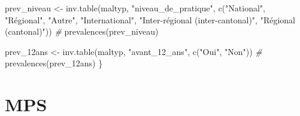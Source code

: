 \documentclass[
]{article}
\newenvironment{Shaded}{\begin{snugshade}}{\end{snugshade}}
\newcommand{\CommentTok}[1]{\textcolor[rgb]{0.56,0.35,0.01}{\textit{#1}}}
\newcommand{\ControlFlowTok}[1]{\textcolor[rgb]{0.13,0.29,0.53}{\textbf{#1}}}
\newcommand{\DecValTok}[1]{\textcolor[rgb]{0.00,0.00,0.81}{#1}}
\newcommand{\FunctionTok}[1]{\textcolor[rgb]{0.00,0.00,0.00}{#1}}
\newcommand{\NormalTok}[1]{#1}
\newcommand{\OtherTok}[1]{\textcolor[rgb]{0.56,0.35,0.01}{#1}}
\newcommand{\SpecialCharTok}[1]{\textcolor[rgb]{0.00,0.00,0.00}{#1}}
\newcommand{\StringTok}[1]{\textcolor[rgb]{0.31,0.60,0.02}{#1}}
\begin{document}
\begin{Shaded}
\begin{Highlighting}[]
\NormalTok{  prev\_niveau }\OtherTok{\textless{}{-}} \FunctionTok{inv.table}\NormalTok{(maltyp, }\StringTok{"niveau\_de\_pratique"}\NormalTok{, }\FunctionTok{c}\NormalTok{(}\StringTok{"National"}\NormalTok{, }\StringTok{"Régional"}\NormalTok{, }\StringTok{"Autre"}\NormalTok{, }
                                  \StringTok{"International"}\NormalTok{, }\StringTok{"Inter{-}régional (inter{-}cantonal)"}\NormalTok{, }\StringTok{"Régional (cantonal)"}\NormalTok{))   }\CommentTok{\# }
  \FunctionTok{prevalences}\NormalTok{(prev\_niveau)}

\NormalTok{  prev\_12ans }\OtherTok{\textless{}{-}} \FunctionTok{inv.table}\NormalTok{(maltyp, }\StringTok{"avant\_12\_ans"}\NormalTok{, }\FunctionTok{c}\NormalTok{(}\StringTok{"Oui"}\NormalTok{, }\StringTok{"Non"}\NormalTok{))   }\CommentTok{\# }
  \FunctionTok{prevalences}\NormalTok{(prev\_12ans)}
\NormalTok{\}}
\end{Highlighting}
\end{Shaded}

\hypertarget{mps}{%
\section{MPS}\label{mps}}

\begin{Shaded}
\end{Shaded}
\end{document}
